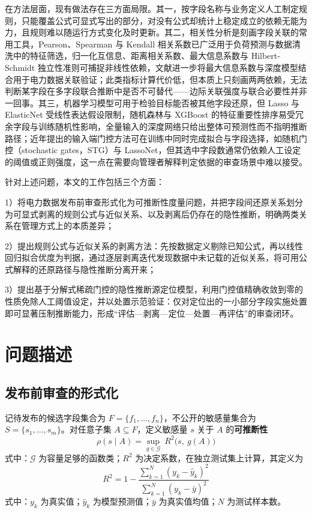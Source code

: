 \documentclass[UTF8,zihao=5,twoside]{ctexart}
\begin{document}
在方法层面，现有做法存在三方面局限。其一，按字段名称与业务定义人工制定规则，只能覆盖公式可显式写出的部分，对没有公式却统计上稳定成立的依赖无能为力，且规则难以随运行方式变化及时更新。其二，相关性分析是刻画字段关联的常用工具，Pearson、Spearman 与 Kendall 相关系数\cite{ref-pearson,ref-spearman,ref-kendall}已广泛用于负荷预测与数据清洗中的特征筛选\cite{ref-lan-load,ref-jiao-pv,ref-deng-load}，归一化互信息\cite{ref-cover-info}、距离相关系数\cite{ref-szekely-dcorr}、最大信息系数\cite{ref-reshef-mic}与 Hilbert-Schmidt 独立性准则\cite{ref-gretton-hsic}可捕捉非线性依赖，文献\cite{ref-xing-micdnn}进一步将最大信息系数与深度模型结合用于电力数据关联验证；此类指标计算代价低，但本质上只刻画两两依赖，无法判断某字段在多字段联合推断中是否不可替代——边际关联强度与联合必要性并非一回事。其三，机器学习模型可用于检验目标能否被其他字段还原\cite{ref-tibshirani-lasso,ref-zou-enet,ref-breiman-rf,ref-chen-xgboost,ref-lecun-deep}，但 Lasso 与 ElasticNet 受线性表达假设限制，随机森林与 XGBoost 的特征重要性排序易受冗余字段与训练随机性影响，全量输入的深度网络只给出整体可预测性而不指明推断路径；近年提出的输入端门控方法可在训练中同时完成拟合与字段选择，如随机门控（stochastic gates，STG）\cite{ref-stg}与 LassoNet\cite{ref-lassonet}，但其选中字段数通常仍依赖人工设定的阈值或正则强度，这一点在需要向管理者解释判定依据的审查场景中难以接受。

针对上述问题，本文的工作包括三个方面：

1）将电力数据发布前审查形式化为可推断性度量问题，并把字段间还原关系划分为可显式剥离的规则公式与近似关系、以及剥离后仍存在的隐性推断，明确两类关系在管理方式上的本质差异；

2）提出规则公式与近似关系的剥离方法：先按数据定义剔除已知公式，再以线性回归拟合优度为判据，通过逐层剥离迭代发现数据中未记载的近似关系，将可用公式解释的还原路径与隐性推断分离开来；

3）提出基于分解式稀疏门控的隐性推断源定位模型，利用门控值精确收敛到零的性质免除人工阈值设定，并以处置示范验证：仅对定位出的一小部分字段实施处置即可显著压制推断能力，形成“评估—剥离—定位—处置—再评估”的审查闭环。

\section{问题描述}

\subsection{发布前审查的形式化}

记待发布的候选字段集合为 $F=\{f_1,\dots,f_n\}$，不公开的敏感量集合为 $S=\{s_1,\dots,s_m\}$。对任意子集 $A\subseteq F$，定义敏感量 $s$ 关于 $A$ 的\textbf{可推断性}
\begin{equation}
\rho(s\mid A)=\sup_{g\in\mathcal{G}}\ R^2\big(s,\ g(A)\big)
\end{equation}
式中：$\mathcal{G}$ 为容量足够的函数类；$R^2$ 为决定系数，在独立测试集上计算，其定义为
\begin{equation}
R^2=1-\frac{\sum_{k=1}^{N}(y_k-\hat y_k)^2}{\sum_{k=1}^{N}(y_k-\bar y)^2}
\end{equation}
式中：$y_k$ 为真实值；$\hat y_k$ 为模型预测值；$\bar y$ 为真实值均值；$N$ 为测试样本数。
\end{document}
